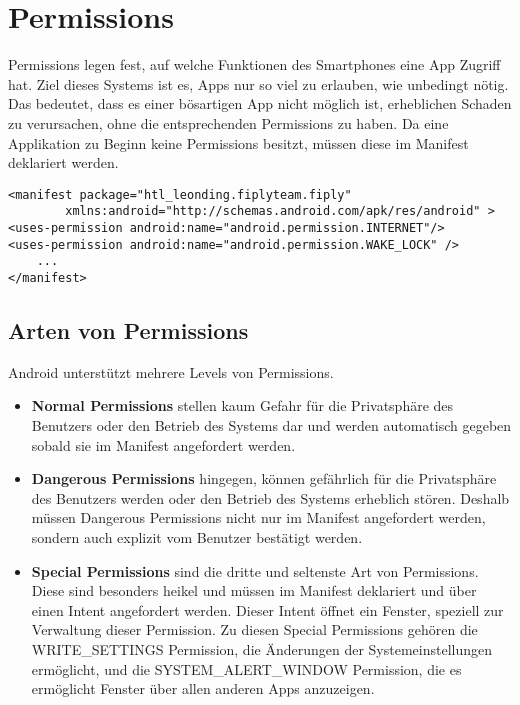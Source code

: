 \documentclass[FIPLY_base.tex]{subfiles}
\author{Andreas Denkmayr}
\date{25. Februar 2016}
\begin{document}
\section{Permissions}
Permissions legen fest, auf welche Funktionen des Smartphones eine App Zugriff hat.
Ziel dieses Systems ist es, Apps nur so viel zu erlauben, wie unbedingt nötig.
Das bedeutet, dass es einer bösartigen App nicht möglich ist, erheblichen Schaden zu verursachen, ohne die entsprechenden Permissions zu haben.
Da eine Applikation zu Beginn keine Permissions besitzt, müssen diese im Manifest deklariert werden. 
\ \\
\begin{lstlisting}
<manifest package="htl_leonding.fiplyteam.fiply"
		xmlns:android="http://schemas.android.com/apk/res/android" >
<uses-permission android:name="android.permission.INTERNET"/>
<uses-permission android:name="android.permission.WAKE_LOCK" />
	...
</manifest>
\end{lstlisting}


\subsection{Arten von Permissions}
Android unterstützt mehrere Levels von Permissions.
\begin{itemize}
\item \textbf{Normal Permissions} stellen kaum Gefahr für die Privatsphäre des Benutzers oder den Betrieb des Systems dar und werden automatisch gegeben sobald sie im Manifest angefordert werden.

\item \textbf{Dangerous Permissions} hingegen, können gefährlich für die Privatsphäre des Benutzers werden oder den Betrieb des Systems erheblich stören. 
Deshalb müssen Dangerous Permissions nicht nur im Manifest angefordert werden, sondern auch explizit vom Benutzer bestätigt werden.

\item \textbf{Special Permissions} sind die dritte und seltenste Art von Permissions. 
Diese sind besonders heikel und müssen im Manifest deklariert und über einen Intent angefordert werden.
Dieser Intent öffnet ein Fenster, speziell zur Verwaltung dieser Permission. \newline
Zu diesen Special Permissions gehören die WRITE\_SETTINGS Permission, die Änderungen der Systemeinstellungen ermöglicht, 
und die SYSTEM\_ALERT\_WINDOW Permission, die es ermöglicht Fenster über allen anderen Apps anzuzeigen.
\end{itemize}
\end{document}
